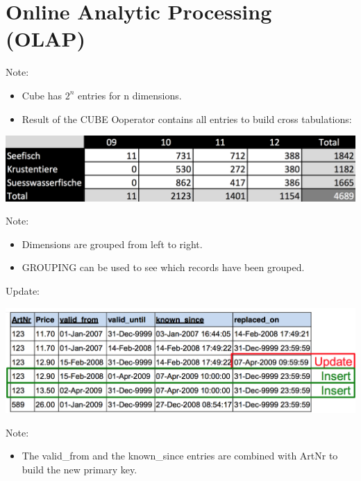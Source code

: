 
\section{Online Analytic Processing (OLAP)}


\begin{breakbox}
Note:
\begin{itemize}
	\item Cube has $2^n$ entries for n dimensions.
	\item Result of the CUBE Ooperator contains all entries to build cross tabulations:
\end{itemize}
\begin{center}
\includegraphics[width=.15\textwidth]{slides_images/cross_tabulation.png}
\end{center}
\end{breakbox}

\begin{breakbox}
Note:
\begin{itemize}
	\item Dimensions are grouped from left to right.
	\item GROUPING can be used to see which records have been grouped.
\end{itemize}
\end{breakbox}

\begin{breakbox}
\newline Update:
\begin{center}
\includegraphics[width=.15\textwidth]{slides_images/bi_temporal_update.png}
\end{center}
Note:
\begin{itemize}
	\item The valid\_from and the known\_since entries are combined with ArtNr to build the new primary key.
\end{itemize}
\end{breakbox}

